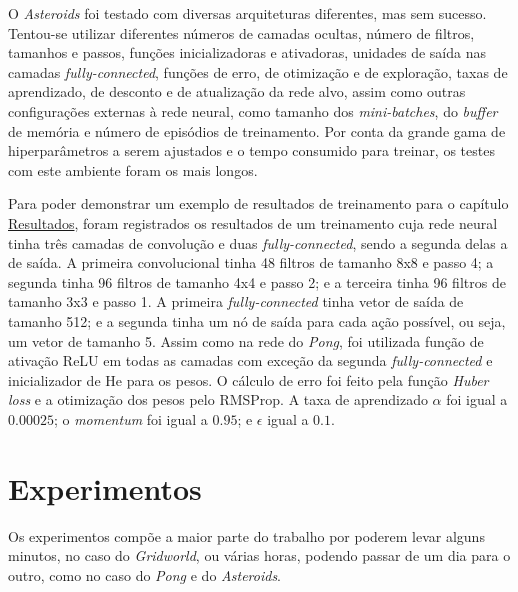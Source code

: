 O \textit{Asteroids} foi testado com diversas arquiteturas diferentes, mas sem sucesso.
Tentou-se utilizar diferentes números de camadas ocultas, número de filtros, tamanhos e passos, funções inicializadoras e ativadoras, unidades de saída nas camadas \textit{fully-connected}, funções de erro, de otimização e de exploração, taxas de aprendizado, de desconto e de atualização da rede alvo, assim como outras configurações externas à rede neural, como tamanho dos \textit{mini-batches}, do \textit{buffer} de memória e número de episódios de treinamento.
Por conta da grande gama de hiperparâmetros a serem ajustados e o tempo consumido para treinar, os testes com este ambiente foram os mais longos.

Para poder demonstrar um exemplo de resultados de treinamento para o capítulo \hyperref[cap:resultados]{Resultados}, foram registrados os resultados de um treinamento cuja rede neural tinha três camadas de convolução e duas \textit{fully-connected}, sendo a segunda delas a de saída.
A primeira convolucional tinha 48 filtros de tamanho 8x8 e passo 4; a segunda tinha 96 filtros de tamanho 4x4 e passo 2; e a terceira tinha 96 filtros de tamanho 3x3 e passo 1.
A primeira \textit{fully-connected} tinha vetor de saída de tamanho 512; e a segunda tinha um nó de saída para cada ação possível, ou seja, um vetor de tamanho 5.
Assim como na rede do \textit{Pong}, foi utilizada função de ativação ReLU em todas as camadas com exceção da segunda \textit{fully-connected} e inicializador de He para os pesos.
O cálculo de erro foi feito pela função \textit{Huber loss} e a otimização dos pesos pelo RMSProp.
A taxa de aprendizado $\alpha$ foi igual a $0.00025$;
o \textit{momentum} foi igual a $0.95$;
e $\epsilon$ igual a $0.1$.


\section{Experimentos}
\label{sec:exp}

Os experimentos compõe a maior parte do trabalho por poderem levar alguns minutos, no caso do \textit{Gridworld}, ou várias horas, podendo passar de um dia para o outro, como no caso do \textit{Pong} e do \textit{Asteroids}.

